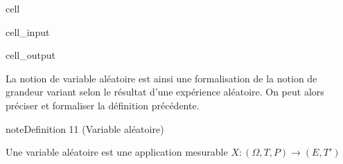 \documentclass[letterpaper,10pt,english]{jupyterBook}
\begin{document}
\begin{sphinxuseclass}{cell}
\begin{sphinxVerbatimInput}
\begin{sphinxuseclass}{cell_input}
\begin{sphinxVerbatim}[commandchars=\\\{\}]
 \PYG{p}{[}\PYG{p}{]} \PYG{p}{[}\PYG{p}{]}
           
\PYG{p}{[}\PYG{p}{]} \PYG{p}{[}\PYG{p}{]} \PYG{p}{[}\PYG{p}{]} 
           
   
\end{sphinxVerbatim}

\end{sphinxuseclass}\end{sphinxVerbatimInput}
\begin{sphinxVerbatimOutput}

\begin{sphinxuseclass}{cell_output}
\noindent{}

\end{sphinxuseclass}\end{sphinxVerbatimOutput}

\end{sphinxuseclass}
\sphinxAtStartPar
La notion de variable aléatoire est ainsi une formalisation de la notion de grandeur variant selon le résultat d’une expérience aléatoire. On peut alors préciser et formaliser la définition précédente.
\label{Rappels:definition-23}
\begin{sphinxadmonition}{note}{Definition 11 (Variable aléatoire)}



\sphinxAtStartPar
Une variable aléatoire est une application mesurable \(X:(\Omega,T,P) \rightarrow (E,T')\)
\end{sphinxadmonition}
\end{document}

